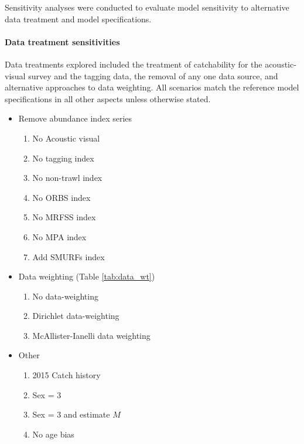 \documentclass[11pt,
  english,
  letterpaper,
]{article}
\providecommand{\tightlist}{%
  \setlength{\itemsep}{0pt}\setlength{\parskip}{0pt}}
\providecommand{\tightlist}{%
  \setlength{\itemsep}{0pt}\setlength{\parskip}{0pt}}
\begin{document}
Sensitivity analyses were conducted to evaluate model sensitivity to alternative data treatment and model specifications.

\hypertarget{data-treatment-sensitivities-1}{%
\paragraph{Data treatment sensitivities}\label{data-treatment-sensitivities-1}}

Data treatments explored included the treatment of catchability for the acoustic-visual survey and the tagging data, the removal of any one data source, and alternative approaches to data weighting. All scenarios match the reference model specifications in all other aspects unless otherwise stated.

\begin{itemize}
\tightlist
\item
  Remove abundance index series

  \begin{enumerate}
  \def\labelenumi{\arabic{enumi}.}
  \tightlist
  \item
    No Acoustic visual
  \item
    No tagging index
  \item
    No non-trawl index
  \item
    No ORBS index
  \item
    No MRFSS index
  \item
    No MPA index
  \item
    Add SMURFs index
  \end{enumerate}
\item
  Data weighting (Table \ref{tab:data_wt})

  \begin{enumerate}
  \def\labelenumi{\arabic{enumi}.}
  \setcounter{enumi}{7}
  \tightlist
  \item
    No data-weighting
  \item
    Dirichlet data-weighting
  \item
    McAllister-Ianelli data weighting
  \end{enumerate}
\item
  Other

  \begin{enumerate}
  \def\labelenumi{\arabic{enumi}.}
  \setcounter{enumi}{10}
  \tightlist
  \item
    2015 Catch history
  \item
    Sex = 3
  \item
    Sex = 3 and estimate \(M\)
  \item
    No age bias
  \end{enumerate}
\end{itemize}
\end{document}
